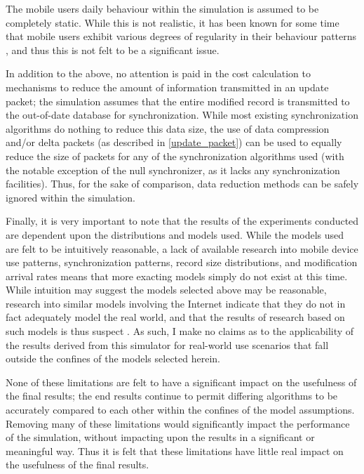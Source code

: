 The mobile users daily behaviour within the simulation is assumed to be completely static.  While this is not realistic, it has been known for some time that mobile users exhibit various degrees of regularity in their behaviour patterns \cite{1704823}, and thus this is not felt to be a significant issue.

In addition to the above, no attention is paid in the cost calculation to mechanisms to reduce the amount of information transmitted in an update packet; the simulation assumes that the entire modified record is transmitted to the out-of-date database for synchronization.  While most existing synchronization algorithms do nothing to reduce this data size, the use of data compression and/or delta packets (as described in \ref{update_packet}) can be used to equally reduce the size of packets for any of the synchronization algorithms used (with the notable exception of the null synchronizer, as it lacks any synchronization facilities).  Thus, for the sake of comparison, data reduction methods can be safely ignored within the simulation.

Finally, it is very important to note that the results of the experiments conducted are dependent upon the distributions and models used.  While the models used are felt to be intuitively reasonable, a lack of available research into mobile device use patterns, synchronization patterns, record size distributions, and modification arrival rates means that more exacting models simply do not exist at this time.  While intuition may suggest the models selected above may be reasonable, research into similar models involving the Internet indicate that they do not in fact adequately model the real world, and that the results of research based on such models is thus suspect \cite{willinger1998mmi}.  As such, I make no claims as to the applicability of the results derived from this simulator for real-world use scenarios that fall outside the confines of the models selected herein.

None of these limitations are felt to have a significant impact on the usefulness of the final results; the end results continue to permit differing algorithms to be accurately compared to each other within the confines of the model assumptions.  Removing many of these limitations would significantly impact the performance of the simulation, without impacting upon the results in a significant or meaningful way.  Thus it is felt that these limitations have little real impact on the usefulness of the final results.

